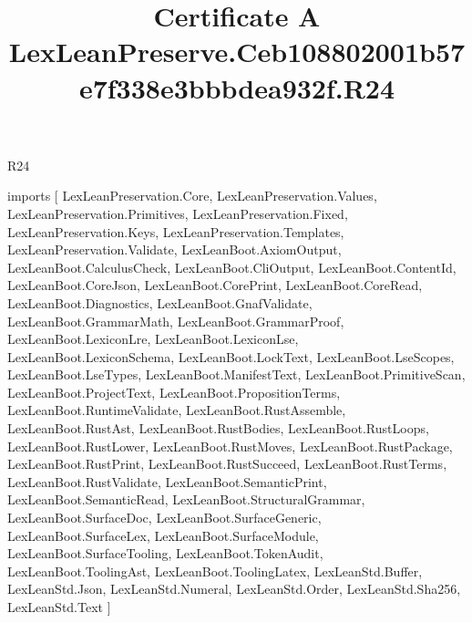 \begin{lexlean}{R24}
\title{Certificate A LexLeanPreserve.Ceb108802001b57e7f338e3bbbdea932f.R24}
\begin{coremodule}
imports [
  LexLeanPreservation.Core,
  LexLeanPreservation.Values,
  LexLeanPreservation.Primitives,
  LexLeanPreservation.Fixed,
  LexLeanPreservation.Keys,
  LexLeanPreservation.Templates,
  LexLeanPreservation.Validate,
  LexLeanBoot.AxiomOutput,
  LexLeanBoot.CalculusCheck,
  LexLeanBoot.CliOutput,
  LexLeanBoot.ContentId,
  LexLeanBoot.CoreJson,
  LexLeanBoot.CorePrint,
  LexLeanBoot.CoreRead,
  LexLeanBoot.Diagnostics,
  LexLeanBoot.GnafValidate,
  LexLeanBoot.GrammarMath,
  LexLeanBoot.GrammarProof,
  LexLeanBoot.LexiconLre,
  LexLeanBoot.LexiconLse,
  LexLeanBoot.LexiconSchema,
  LexLeanBoot.LockText,
  LexLeanBoot.LseScopes,
  LexLeanBoot.LseTypes,
  LexLeanBoot.ManifestText,
  LexLeanBoot.PrimitiveScan,
  LexLeanBoot.ProjectText,
  LexLeanBoot.PropositionTerms,
  LexLeanBoot.RuntimeValidate,
  LexLeanBoot.RustAssemble,
  LexLeanBoot.RustAst,
  LexLeanBoot.RustBodies,
  LexLeanBoot.RustLoops,
  LexLeanBoot.RustLower,
  LexLeanBoot.RustMoves,
  LexLeanBoot.RustPackage,
  LexLeanBoot.RustPrint,
  LexLeanBoot.RustSucceed,
  LexLeanBoot.RustTerms,
  LexLeanBoot.RustValidate,
  LexLeanBoot.SemanticPrint,
  LexLeanBoot.SemanticRead,
  LexLeanBoot.StructuralGrammar,
  LexLeanBoot.SurfaceDoc,
  LexLeanBoot.SurfaceGeneric,
  LexLeanBoot.SurfaceLex,
  LexLeanBoot.SurfaceModule,
  LexLeanBoot.SurfaceTooling,
  LexLeanBoot.TokenAudit,
  LexLeanBoot.ToolingAst,
  LexLeanBoot.ToolingLatex,
  LexLeanStd.Buffer,
  LexLeanStd.Json,
  LexLeanStd.Numeral,
  LexLeanStd.Order,
  LexLeanStd.Sha256,
  LexLeanStd.Text
]


\end{coremodule}
\end{lexlean}
